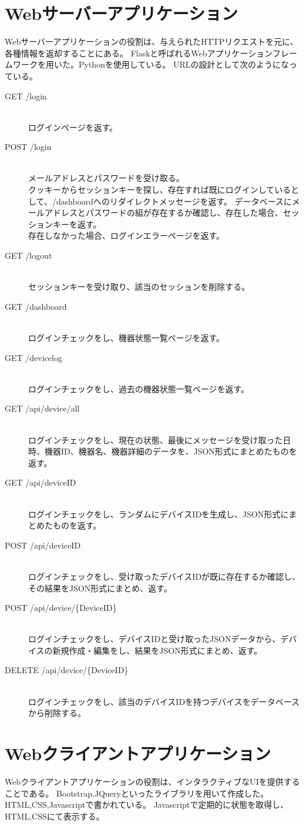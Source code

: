 \section{Webサーバーアプリケーション}
Webサーバーアプリケーションの役割は、与えられたHTTPリクエストを元に、各種情報を返却することにある。
Flaskと呼ばれるWebアプリケーションフレームワークを用いた。Pythonを使用している。
URLの設計として次のようになっている。
\begin{description}
	\item[GET /login]\mbox{}\\
		ログインページを返す。
	\item[POST /login]\mbox{}\\
		メールアドレスとパスワードを受け取る。\\
		クッキーからセッションキーを探し、存在すれば既にログインしているとして、/dashboardへのリダイレクトメッセージを返す。
		データベースにメールアドレスとパスワードの組が存在するか確認し、存在した場合、セッションキーを返す。\\
		存在しなかった場合、ログインエラーページを返す。
	\item[GET /logout]\mbox{}\\
		セッションキーを受け取り、該当のセッションを削除する。\\
	\item[GET /dashboard]\mbox{}\\
		ログインチェックをし、機器状態一覧ページを返す。
	\item[GET /devicelog]\mbox{}\\
		ログインチェックをし、過去の機器状態一覧ページを返す。
	\item[GET /api/device/all]\mbox{}\\
		ログインチェックをし、現在の状態、最後にメッセージを受け取った日時、機器ID、機器名、機器詳細のデータを、JSON形式にまとめたものを返す。
	\item[GET /api/deviceID]\mbox{}\\
		ログインチェックをし、ランダムにデバイスIDを生成し、JSON形式にまとめたものを返す。
	\item[POST /api/deviceID]\mbox{}\\
		ログインチェックをし、受け取ったデバイスIDが既に存在するか確認し、その結果をJSON形式にまとめ、返す。
	\item[POST /api/device/\{DeviceID\}]\mbox{}\\
		ログインチェックをし、デバイスIDと受け取ったJSONデータから、デバイスの新規作成・編集をし、結果をJSON形式にまとめ、返す。
	\item[DELETE /api/device/\{DeviceID\}]\mbox{}\\
		ログインチェックをし、該当のデバイスIDを持つデバイスをデータベースから削除する。	
\end{description}

\section{Webクライアントアプリケーション}
Webクライアントアプリケーションの役割は、インタラクティブなUIを提供することである。
Bootstrap,JQueryといったライブラリを用いて作成した。HTML,CSS,Javascriptで書かれている。
Javascriptで定期的に状態を取得し、HTML,CSSにて表示する。




